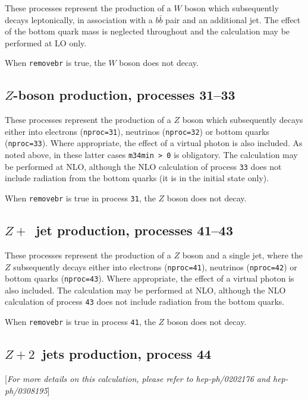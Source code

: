 \documentclass[12pt]{article}
\begin{document}
These processes represent the production of a $W$ boson which subsequently
decays leptonically, in association with a $b{\bar b}$ pair and an
additional jet. The effect of the bottom quark mass is neglected throughout
and the calculation may be performed at LO only.

When {\tt removebr} is true, the $W$ boson does not decay.

\subsection{$Z$-boson production, processes 31--33}
\label{subsec:zboson}

These processes represent the production of a $Z$ boson which subsequently
decays either into electrons ({\tt nproc=31}), neutrinos ({\tt nproc=32})
or bottom quarks ({\tt nproc=33}). Where appropriate, the effect of a virtual
photon is also included. As noted above, in these latter cases {\tt m34min > 0}
is obligatory. The calculation may be performed at NLO,
although the NLO calculation of process {\tt 33} does not include radiation
from the bottom quarks (it is in the initial state only).

When {\tt removebr} is true in process {\tt 31}, the $Z$ boson does not decay.

\subsection{$Z+$~jet production, processes 41--43}
\label{subsec:zjet}

These processes represent the production of a $Z$ boson and a single jet,
where the $Z$ subsequently
decays either into electrons ({\tt nproc=41}), neutrinos ({\tt nproc=42})
or bottom quarks ({\tt nproc=43}). Where appropriate, the effect of a virtual
photon is also included. The calculation may be performed at NLO,
although the NLO calculation of process {\tt 43} does not include radiation
from the bottom quarks.

When {\tt removebr} is true in process {\tt 41}, the $Z$ boson does not decay.

\subsection{$Z+2$~jets production, process 44}
\label{subsec:z2jets}

\begin{center}
[{\it For more details on this calculation, please refer to \break
 hep-ph/0202176 and hep-ph/0308195}]
\end{center}
\end{document}
